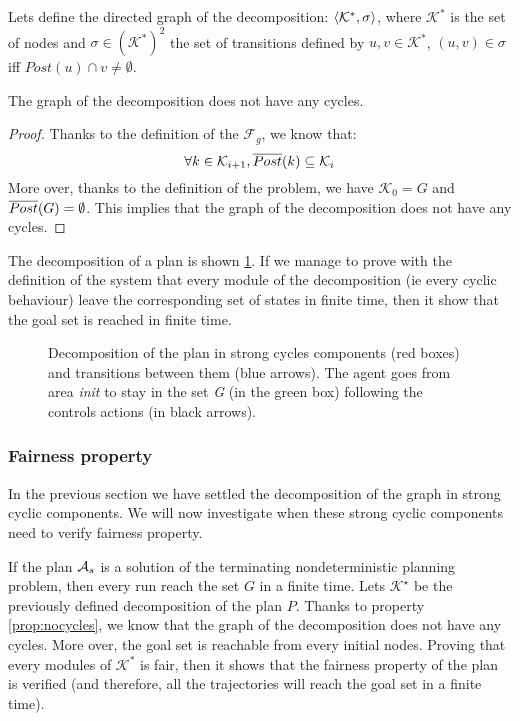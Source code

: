 Lets define the directed graph of the decomposition: $\systuple{\mathcal{K}^*, \sigma}$, where $\mathcal{K}^*$ is the set of nodes and $\sigma \in (\mathcal{K}^*)^2$ the set of transitions defined by $u,v \in \mathcal{K}^*$, $(u,v) \in \sigma$ iff $Post(u) \cap v \neq \emptyset$. 

\begin{prop}\label{prop:nocycles}
The graph of the decomposition does not have any cycles.
\end{prop}

\begin{proof}
Thanks to the definition of the $\mathcal{F}_g$, we know that:
\begin{equation}
\forall k \in \mathcal{K}_{i+1}, \overline{Post} (k) \subseteq \mathcal{K}_i
\end{equation}
More over, thanks to the definition of the problem, we have $\mathcal{K}_0 = G$ and $\overline{Post} (G) = \emptyset$.
This implies that the graph of the decomposition does not have any cycles.
\end{proof}


The decomposition of a plan is shown \ref{fig:plan_decomposition}. If we manage to prove with the definition of the system that every module of the decomposition (ie every cyclic behaviour) leave the corresponding set of states in finite time, then it show that the goal set is reached in finite time.
\begin{figure}
	\center
	
	\caption{Decomposition of the plan in strong cycles components (red boxes) and transitions between them (blue arrows). The agent goes from area \textit{init} to stay in the set \textit{G} (in the green box) following the controls actions (in black arrows).}
	\label{fig:plan_decomposition}
\end{figure}

\subsubsection{Fairness property}
In the previous section we have settled the decomposition of the graph in strong cyclic components.
We will now investigate when these strong cyclic components need to verify fairness property.

If the plan $\mathcal{A}_s$ is a solution of the terminating nondeterministic planning problem, then every run reach the set $G$ in a finite time.
Lets $\mathcal{K}^\star$ be the previously defined decomposition of the plan $P$.
Thanks to property \ref{prop:nocycles}, we know that the graph of the decomposition does not have any cycles. More over, the goal set is reachable from every initial nodes.
Proving that every modules of $\mathcal{K}^*$ is fair, then it shows that the fairness property of the plan is verified (and therefore, all the trajectories will reach the goal set in a finite time).

